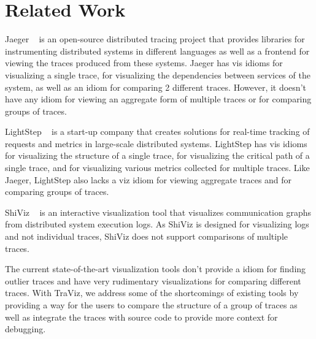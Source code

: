 \section{Related Work}

Jaeger ~\cite{Jaeger} is an open-source distributed tracing project
that provides libraries for instrumenting distributed systems
in different languages as well as a frontend for viewing the traces
produced from these systems. Jaeger has vis idioms for visualizing
a single trace, for visualizing the dependencies between services
of the system, as well as an idiom for comparing 2 different traces.
However, it doesn't have any idiom for viewing an aggregate form of
multiple traces or for comparing groups of traces.

LightStep ~\cite{LightStep} is a start-up company that
creates solutions for real-time tracking of requests and metrics
in large-scale distributed systems. LightStep has vis idioms
for visualizing the structure of a single trace, for visualizing
the critical path of a single trace, and 
for visualizing various metrics collected for multiple traces.
Like Jaeger, LightStep also lacks a viz idiom for viewing aggregate
traces and for comparing groups of traces.

ShiViz ~\cite{ShiViz} is an interactive visualization tool
that visualizes communication graphs from distributed system execution
logs. As ShiViz is designed for visualizing logs and not individual traces,
ShiViz does not support comparisons of multiple traces.

The current state-of-the-art visualization tools don't provide a idiom for finding
outlier traces and have very rudimentary visualizations for comparing
different traces. 
With TraViz, we address some of the shortcomings of existing tools
by providing a way for the users to compare the structure of a group of traces
as well as integrate the traces with source code to provide more context
for debugging.